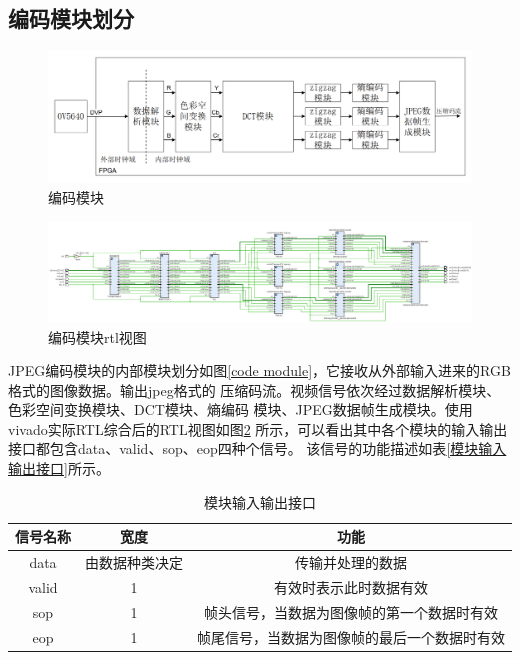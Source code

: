 \documentclass{article}
\numberwithin {equation}{section}
\begin{document}
\begin{spacing}{1.25}
  \subsection{编码模块划分}
    \vspace{1em}
    \begin{figure}[H]
      \centering
      \includegraphics[scale=0.3]{./pictures/CoderTop.png}
      \caption{编码模块}
      \label{code module}
    \end{figure}
    \begin{figure}[H]
      \centering
      \includegraphics[scale=0.3]{./pictures/TOPrtl.png}
      \caption{编码模块rtl视图}
      \label{code module rtl}
    \end{figure}
    JPEG编码模块的内部模块划分如图\ref{code 
    module}，它接收从外部输入进来的RGB格式的图像数据。输出jpeg格式的
    压缩码流。视频信号依次经过数据解析模块、色彩空间变换模块、DCT模块、熵编码
    模块、JPEG数据帧生成模块。使用vivado实际RTL综合后的RTL视图如图\ref{code module rtl}
    所示，可以看出其中各个模块的输入输出接口都包含data、valid、sop、eop四种个信号。
    该信号的功能描述如表\ref{模块输入输出接口}所示。

    \begin{table}[H]
      \centering
      \caption{模块输入输出接口}
      \begin{tabular}{ccc}
        \toprule
        信号名称 & 宽度 & 功能\\
        \midrule
        data & 由数据种类决定 & 传输并处理的数据\\
        valid & 1 & 有效时表示此时数据有效\\
        sop & 1 & 帧头信号，当数据为图像帧的第一个数据时有效\\
        eop & 1 & 帧尾信号，当数据为图像帧的最后一个数据时有效\\
        \bottomrule
      \end{tabular}
    \end{table}


\end{spacing}
\end{document}

